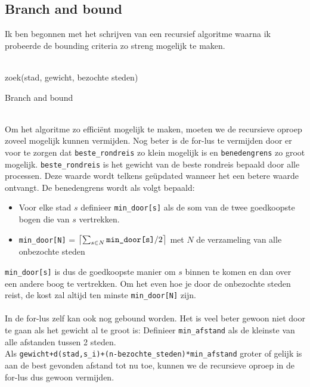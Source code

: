 \documentclass[12pt]{article}
\DeclarePairedDelimiter{\ceil}{\lceil}{\rceil}
\begin{document}
\subsection{Branch and bound}
Ik ben begonnen met het schrijven van een recursief algoritme waarna ik probeerde de bounding criteria zo streng mogelijk te maken.
\\
\\
\begin{algorithm}[H]
\SetAlgoLined 
zoek(stad, gewicht, bezochte steden)\;
 \caption{Branch and bound}
\end{algorithm}
\noindent
\\
Om het algoritme zo effici\"ent mogelijk te maken, moeten we de recursieve oproep zoveel mogelijk kunnen vermijden. Nog beter is de for-lus te vermijden door er voor te zorgen dat \verb!beste_rondreis! zo klein mogelijk is en \verb!benedengrens! zo groot mogelijk. 
\verb!beste_rondreis! is het gewicht van de beste rondreis bepaald door alle processen. Deze waarde wordt telkens ge\"updated wanneer het een betere waarde ontvangt.
De benedengrens wordt als volgt bepaald:
\begin{itemize}
\item Voor elke stad $s$ definieer \verb!min_door[s]! als de som van de twee goedkoopste bogen die van $s$ vertrekken.
\item \verb!min_door[N]! = $\ceil[\big]{\sum_{s \in N}\texttt{min\_door[s]}/2}$ met $N$ de verzameling van alle onbezochte steden
\end{itemize}
\verb!min_door[s]! is dus de goedkoopste manier om $s$ binnen te komen en dan over een andere boog te vertrekken. Om het even hoe je door de onbezochte steden reist, de kost zal altijd ten minste \verb!min_door[N]! zijn.
\\
\\
In de for-lus zelf kan ook nog gebound worden. Het is veel beter gewoon niet door te gaan als het gewicht al te groot is:
Definieer \verb!min_afstand! als de kleinste van alle afstanden tussen 2 steden.  \\
Als \verb!gewicht+d(stad,s_i)+(n-bezochte_steden)*min_afstand! groter of gelijk is aan de best gevonden afstand tot nu toe, kunnen we de recursieve oproep in de for-lus dus gewoon vermijden.
\end{document}
